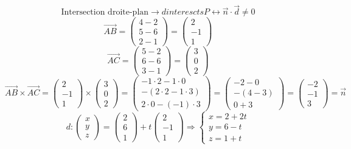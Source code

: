\documentclass{article}
\begin{document}
\[ \text{Intersection droite-plan} \rightarrow d interescts P \leftrightarrow \vec{n} \cdot \vec{d} \neq 0 \]
\[ \vec{AB} = \begin{pmatrix} 4-2 \\ 5-6 \\ 2-1 \end{pmatrix} = \begin{pmatrix} 2 \\ -1 \\ 1 \end{pmatrix} \]
\[ \vec{AC} = \begin{pmatrix} 5-2 \\ 6-6 \\ 3-1 \end{pmatrix} = \begin{pmatrix} 3 \\ 0 \\ 2 \end{pmatrix} \]
\[ \vec{AB} \times \vec{AC} = \begin{pmatrix} 2 \\ -1 \\ 1 \end{pmatrix} \times \begin{pmatrix} 3 \\ 0 \\ 2 \end{pmatrix} = \begin{pmatrix} -1 \cdot 2 - 1 \cdot 0 \\ -(2 \cdot 2 - 1 \cdot 3) \\ 2 \cdot 0 - (-1) \cdot 3 \end{pmatrix} = \begin{pmatrix} -2 - 0 \\ -(4 - 3) \\ 0 + 3 \end{pmatrix} = \begin{pmatrix} -2 \\ -1 \\ 3 \end{pmatrix} = \vec{n} \]
\[ d: \begin{pmatrix} x \\ y \\ z \end{pmatrix} = \begin{pmatrix} 2 \\ 6 \\ 1 \end{pmatrix} + t \begin{pmatrix} 2 \\ -1 \\ 1 \end{pmatrix} \Rightarrow \begin{cases} x = 2 + 2t \\ y = 6 - t \\ z = 1 + t \end{cases} \]
\end{document}
